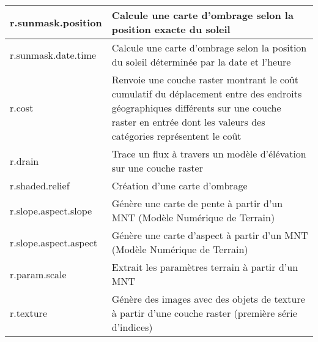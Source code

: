 \begin{table}[H]
\begin{tabular}{|p{4cm}|p{10cm}|}
  \hline r.sunmask.position & Calcule une carte d'ombrage selon la position exacte du soleil \\  
  \hline r.sunmask.date.time & Calcule une carte d'ombrage selon la position du soleil déterminée par la date et l'heure \\  
  \hline r.cost & Renvoie une couche raster montrant le coût cumulatif du déplacement entre des endroits géographiques différents sur une couche raster en entrée dont les valeurs des catégories représentent le coût\\
  \hline r.drain & Trace un flux à travers un modèle d'élévation sur une couche raster\\
  \hline r.shaded.relief & Création d'une carte d'ombrage \\
  \hline r.slope.aspect.slope & Génère une carte de pente à partir d'un MNT (Modèle Numérique de Terrain) \\
  \hline r.slope.aspect.aspect & Génère une carte d'aspect à partir d'un MNT (Modèle Numérique de Terrain) \\
  \hline r.param.scale & Extrait les paramètres terrain à partir d'un MNT \\
  \hline r.texture & Génère des images avec des objets de texture à partir d'une couche raster (première série d'indices)\\

\end{tabular}
\end{table}

